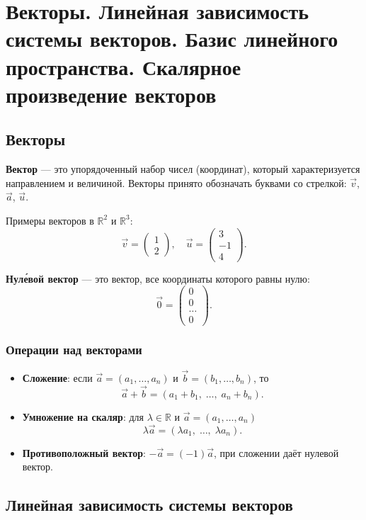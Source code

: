 \section{Векторы. Линейная зависимость системы векторов. Базис линейного пространства. Скалярное произведение векторов}

\subsection{Векторы}

\textbf{Вектор} — это упорядоченный набор чисел (координат), который характеризуется направлением и величиной. Векторы принято обозначать буквами со стрелкой: $\vec{v}$, $\vec{a}$, $\vec{u}$.

Примеры векторов в $\mathbb{R}^2$ и $\mathbb{R}^3$:
\[
\vec{v} = \begin{pmatrix}1 \\ 2\end{pmatrix}, \quad
\vec{u} = \begin{pmatrix}3 \\ -1 \\ 4\end{pmatrix}.
\]

\textbf{Нуле́вой вектор} — это вектор, все координаты которого равны нулю:
\[
\vec{0} = \begin{pmatrix}0 \\ 0 \\ \dots \\ 0\end{pmatrix}.
\]

\subsubsection{Операции над векторами}

\begin{itemize}[leftmargin=*]
  \item \textbf{Сложение}: если $\vec{a}=(a_1,\dots,a_n)$ и $\vec{b}=(b_1,\dots,b_n)$, то
    \[
      \vec{a} + \vec{b} = (a_1+b_1,\; \dots,\; a_n+b_n).
    \]
  \item \textbf{Умножение на скаляр}: для $\lambda\in\mathbb{R}$ и $\vec{a}=(a_1,\dots,a_n)$
    \[
      \lambda \vec{a} = (\lambda a_1,\; \dots,\; \lambda a_n).
    \]
  \item \textbf{Противоположный вектор}: $-\vec{a} = (-1)\vec{a}$, при сложении даёт нулевой вектор.
\end{itemize}

\subsection{Линейная зависимость системы векторов}

